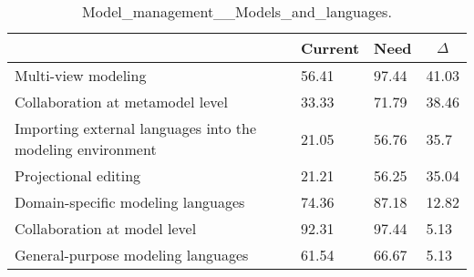 
  \begin{table*}[]
  \centering
  \notsotiny
  \caption{ Model_management__Models_and_languages.}
\label{tab:model_management__models_and_languages}
\begin{tabular}{|l|l|l|l|}
  \hline
  \rowcolor[HTML]{C0C0C0}
    \multicolumn{1}{|c|}{Feature} & \multicolumn{1}{c|}{Current} & \multicolumn{1}{c|}{Need} & \multicolumn{1}{c|}{$\Delta$} \\ \hline
  Multi-view modeling & 56.41 & 97.44 & 41.03 \\ \hline 
Collaboration at metamodel level & 33.33 & 71.79 & 38.46 \\ \hline 
Importing external languages into the modeling environment & 21.05 & 56.76 & 35.7 \\ \hline 
Projectional editing & 21.21 & 56.25 & 35.04 \\ \hline 
Domain-specific modeling languages & 74.36 & 87.18 & 12.82 \\ \hline 
Collaboration at model level & 92.31 & 97.44 & 5.13 \\ \hline 
General-purpose modeling languages & 61.54 & 66.67 & 5.13 \\ \hline 
\end{tabular}%
  \end{table*}